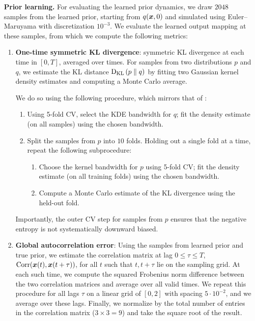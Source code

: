 \textbf{Prior learning.}
For evaluating the learned prior dynamics, we draw $2048$ samples from the learned prior, starting from $q(\boldsymbol{x}, 0)$ and simulated using Euler--Maruyama with discretization $10^{-3}$. 
We evaluate the learned output mapping at these samples, from which we compute the following metrics:
\begin{enumerate}[label=(\roman*)]
    \item \textbf{One-time symmetric KL divergence}: symmetric KL divergence at each time in $[0, T]$, averaged over times. 
    For samples from two distributions $p$ and $q$, we estimate the KL distance $\textrm{D}_{\textrm{KL}}\left(p\;\|\;q\right)$ by fitting two Gaussian kernel density estimates and computing a Monte Carlo average.
    
    We do so using the following procedure, which mirrors that of \citet{kiyohara2025neural}:
    \begin{enumerate}
        \item Using 5-fold CV, select the KDE bandwidth for $q$; fit the density estimate (on all samples) using the chosen bandwidth.
        \item Split the samples from $p$ into $10$ folds. Holding out a single fold at a time, repeat the following subprocedure:
        \begin{enumerate}
            \item Choose the kernel bandwidth for $p$ using 5-fold CV; fit the density estimate (on all training folds) using the chosen bandwidth.
            \item Compute a Monte Carlo estimate of the KL divergence using the held-out fold.
        \end{enumerate}
    \end{enumerate}
    Importantly, the outer CV step for samples from $p$ ensures that the negative entropy is not systematically downward biased.
    
    \item \textbf{Global autocorrelation error}: Using the samples from learned prior and true prior, we estimate the correlation matrix at lag $0 \leq \tau \leq T$, $\mathrm{Corr}(\boldsymbol{x}(t), \boldsymbol{x}(t + \tau))$, for all $t$ such that $t, t + \tau$ lie on the sampling grid. 
    At each such time, we compute the squared Frobenius norm difference between the two correlation matrices and average over all valid times. We repeat this procedure for all lags $\tau$ on a linear grid of $[0, 2]$ with spacing $5 \cdot 10^{-2}$, and we average over these lags.
    Finally, we normalize by the total number of entries in the correlation matrix ($3 \times 3 = 9$) and take the square root of the result.
\end{enumerate}


